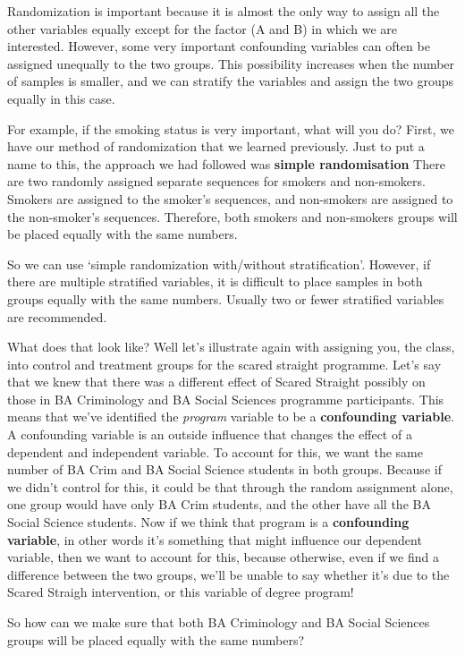 \documentclass[]{book}
\theoremstyle{definition}
\theoremstyle{definition}
\theoremstyle{definition}
\theoremstyle{remark}
\begin{document}
Randomization is important because it is almost the only way to assign
all the other variables equally except for the factor (A and B) in which
we are interested. However, some very important confounding variables
can often be assigned unequally to the two groups. This possibility
increases when the number of samples is smaller, and we can stratify the
variables and assign the two groups equally in this case.

For example, if the smoking status is very important, what will you do?
First, we have our method of randomization that we learned previously.
Just to put a name to this, the approach we had followed was
\textbf{simple randomisation} There are two randomly assigned separate
sequences for smokers and non-smokers. Smokers are assigned to the
smoker's sequences, and non-smokers are assigned to the non-smoker's
sequences. Therefore, both smokers and non-smokers groups will be placed
equally with the same numbers.

So we can use `simple randomization with/without stratification'.
However, if there are multiple stratified variables, it is difficult to
place samples in both groups equally with the same numbers. Usually two
or fewer stratified variables are recommended.

 What does that look like? Well let's illustrate again with assigning
you, the class, into control and treatment groups for the scared
straight programme. Let's say that we knew that there was a different
effect of Scared Straight possibly on those in BA Criminology and BA
Social Sciences programme participants. This means that we've identified
the \emph{program} variable to be a \textbf{confounding variable}. A
confounding variable is an outside influence that changes the effect of
a dependent and independent variable. To account for this, we want the
same number of BA Crim and BA Social Science students in both groups.
Because if we didn't control for this, it could be that through the
random assignment alone, one group would have only BA Crim students, and
the other have all the BA Social Science students. Now if we think that
program is a \textbf{confounding variable}, in other words it's
something that might influence our dependent variable, then we want to
account for this, because otherwise, even if we find a difference
between the two groups, we'll be unable to say whether it's due to the
Scared Straigh intervention, or this variable of degree program!

So how can we make sure that both BA Criminology and BA Social Sciences
groups will be placed equally with the same numbers?
\end{document}
